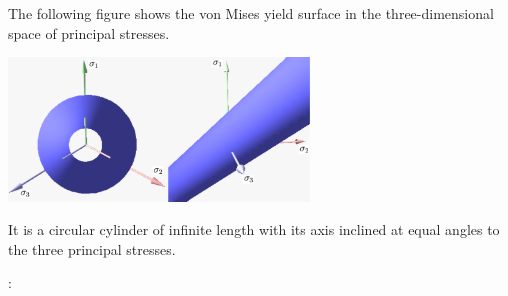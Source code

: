 The following figure shows the von Mises yield surface in the three-dimensional space of principal stresses. 
\begin{center}
\includegraphics[width=0.6\textwidth]{images/rheology/vonmises/vonmises.pdf}
\end{center}
It is a circular cylinder of infinite length with its axis inclined at equal angles to the three principal stresses. 

\Literature: \cite{papa87,long03}

